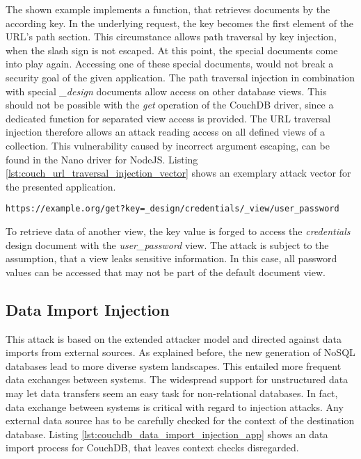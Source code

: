 The shown example implements a function, that retrieves documents by the according key. In the underlying request, the key becomes the first element of the URL's path section. This circumstance allows path traversal by key injection, when the slash sign is not escaped. At this point, the special documents come into play again. Accessing one of these special documents, would not break a security goal of the given application. The path traversal injection in combination with special \emph{\_design} documents allow access on other database views. This should not be possible with the \emph{get} operation of the CouchDB driver, since a dedicated function for separated view access is provided. The URL traversal injection therefore allows an attack reading access on all defined views of a collection. This vulnerability caused by incorrect argument escaping, can be found in the Nano driver for NodeJS. Listing \ref{lst:couch_url_traversal_injection_vector} shows an exemplary attack vector for the presented application. \\


\begin{lstlisting}[caption={Attack vectors on CouchDB for URL traversal injection via HTTP GET}, label={lst:couch_url_traversal_injection_vector}]
https://example.org/get?key=_design/credentials/_view/user_password
\end{lstlisting}

To retrieve data of another view, the key value is forged to access the \emph{credentials} design document with the \emph{user\_password} view. The attack is subject to the assumption, that a view leaks sensitive information. In this case, all password values can be accessed that may not be part of the default document view. \\


\subsection{Data Import Injection}
This attack is based on the extended attacker model and directed against data imports from external sources. As explained before, the new generation of NoSQL databases lead to more diverse system landscapes. This entailed more frequent data exchanges between systems. The widespread support for unstructured data may let data transfers seem an easy task for non-relational databases. In fact, data exchange between systems is critical with regard to injection attacks. Any external data source has to be carefully checked for the context of the destination database. Listing \ref{lst:couchdb_data_import_injection_app} shows an data import process for CouchDB, that leaves context checks disregarded.\\

